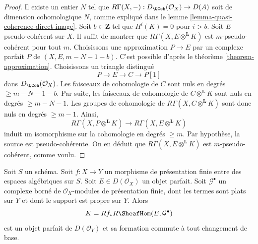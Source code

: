 \begin{proof}
Il existe un entier $N$ tel que
$R\Gamma(X, -) : D_\QCoh(\mathcal{O}_X) \to D(A)$
soit de dimension cohomologique $N$, comme expliqu\'e dans le
lemme \ref{lemma-quasi-coherence-direct-image}.
Soit $b \in \mathbf{Z}$ tel que $H^i(K) = 0$ pour $i > b$.
Soit $E$ pseudo-coh\'erent sur $X$.
Il suffit de montrer que $R\Gamma(X, E \otimes^\mathbf{L} K)$
est $m$-pseudo-coh\'erent pour tout $m$.
Choisissons une approximation $P \to E$ par un complexe parfait $P$
de $(X, E, m - N - 1 - b)$. C'est possible d'apr\`es le
th\'eor\`eme \ref{theorem-approximation}.
Choisissons un triangle distingu\'e
$$
P \to E \to C \to P[1]
$$
dans $D_\QCoh(\mathcal{O}_X)$. Les faisceaux de cohomologie de $C$ sont nuls
en degr\'es $\geq m - N - 1 - b$. Par suite, les faisceaux de cohomologie
de $C \otimes^\mathbf{L} K$ sont nuls en degr\'es $\geq m - N - 1$.
Les groupes de cohomologie de $R\Gamma(X, C \otimes^\mathbf{L} K)$
sont donc nuls en degr\'es $\geq m - 1$. Ainsi,
$$
R\Gamma(X, P \otimes^\mathbf{L} K) \to R\Gamma(X, E \otimes^\mathbf{L} K)
$$
induit un isomorphisme sur la cohomologie en degr\'es $\geq m$.
Par hypoth\`ese, la source est pseudo-coh\'erente.
On en d\'eduit que $R\Gamma(X, E \otimes^\mathbf{L} K)$
est $m$-pseudo-coh\'erent, comme voulu.
\end{proof}

\begin{lemma}
\label{lemma-base-change-RHom-perfect}
Soit $S$ un sch\'ema.
Soit $f : X \to Y$ un morphisme de pr\'esentation finie
entre des espaces alg\'ebriques sur $S$.
Soit $E \in D(\mathcal{O}_X)$ un objet parfait. Soit $\mathcal{G}^\bullet$
un complexe born\'e de $\mathcal{O}_X$-modules de pr\'esentation finie,
dont les termes sont plats sur $Y$ et dont le support est propre sur $Y$. Alors
$$
K = Rf_*R\SheafHom(E, \mathcal{G}^\bullet)
$$
est un objet parfait de $D(\mathcal{O}_Y)$ et sa formation
commute \`a tout changement de base.
\end{lemma}

